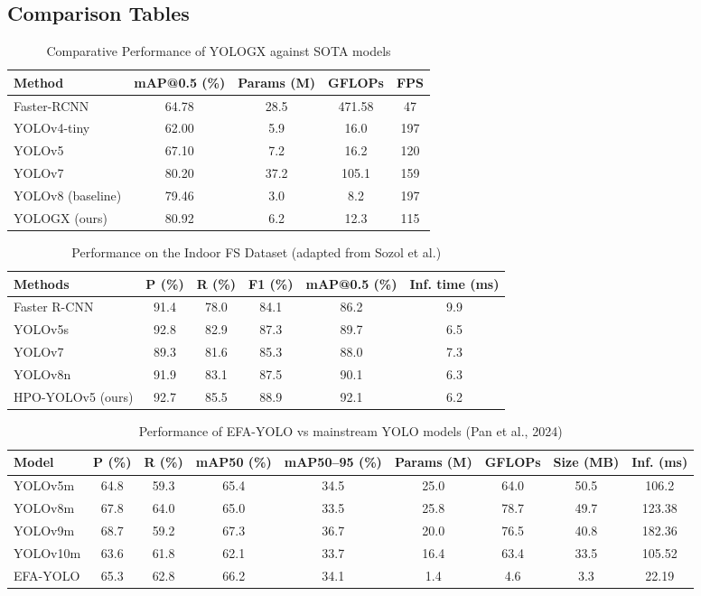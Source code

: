 \documentclass[12pt,a4paper]{article}
\begin{document}
\subsection{Comparison Tables}
\begin{table}[h]
  \centering
  \caption{Comparative Performance of YOLOGX against SOTA models}
  \small
  \begin{tabular}{lcccc}
    \toprule
    Method & mAP@0.5 (\%) & Params (M) & GFLOPs & FPS \\
    \midrule
    Faster-RCNN & 64.78 & 28.5 & 471.58 & 47 \\
    YOLOv4-tiny & 62.00 & 5.9 & 16.0 & 197 \\
    YOLOv5 & 67.10 & 7.2 & 16.2 & 120 \\
    YOLOv7 & 80.20 & 37.2 & 105.1 & 159 \\
    YOLOv8 (baseline) & 79.46 & 3.0 & 8.2 & 197 \\
    YOLOGX (ours) & 80.92 & 6.2 & 12.3 & 115 \\
    \bottomrule
  \end{tabular}
\end{table}

\begin{table}[h]
  \centering
  \caption{Performance on the Indoor FS Dataset (adapted from Sozol et al.)}
  \small
  \begin{tabular}{lccccc}
    \toprule
    Methods & P (\%) & R (\%) & F1 (\%) & mAP@0.5 (\%) & Inf. time (ms) \\
    \midrule
    Faster R-CNN & 91.4 & 78.0 & 84.1 & 86.2 & 9.9 \\
    YOLOv5s & 92.8 & 82.9 & 87.3 & 89.7 & 6.5 \\
    YOLOv7 & 89.3 & 81.6 & 85.3 & 88.0 & 7.3 \\
    YOLOv8n & 91.9 & 83.1 & 87.5 & 90.1 & 6.3 \\
    HPO-YOLOv5 (ours) & 92.7 & 85.5 & 88.9 & 92.1 & 6.2 \\
    \bottomrule
  \end{tabular}
\end{table}

\begin{table}[h]
  \centering
  \caption{Performance of EFA-YOLO vs mainstream YOLO models (Pan et al., 2024)}
  \small
  \begin{tabular}{lcccccccc}
    \toprule
    Model & P (\%) & R (\%) & mAP50 (\%) & mAP50--95 (\%) & Params (M) & GFLOPs & Size (MB) & Inf. (ms) \\
    \midrule
    YOLOv5m & 64.8 & 59.3 & 65.4 & 34.5 & 25.0 & 64.0 & 50.5 & 106.2 \\
    YOLOv8m & 67.8 & 64.0 & 65.0 & 33.5 & 25.8 & 78.7 & 49.7 & 123.38 \\
    YOLOv9m & 68.7 & 59.2 & 67.3 & 36.7 & 20.0 & 76.5 & 40.8 & 182.36 \\
    YOLOv10m & 63.6 & 61.8 & 62.1 & 33.7 & 16.4 & 63.4 & 33.5 & 105.52 \\
    EFA-YOLO & 65.3 & 62.8 & 66.2 & 34.1 & 1.4 & 4.6 & 3.3 & 22.19 \\
    \bottomrule
  \end{tabular}
\end{table}
\end{document}
